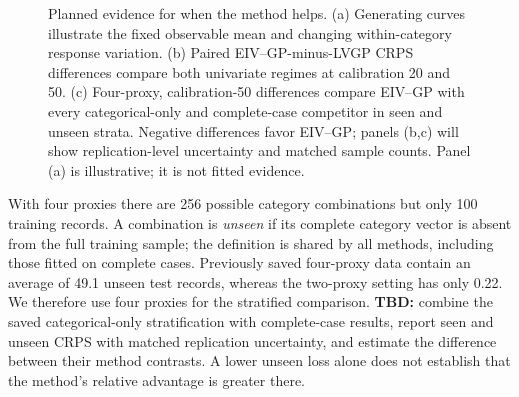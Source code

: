 \begin{figure}[!htbp]
\centering\small
{}\hfill
{}\hfill
{}
\caption{Planned evidence for when the method helps. (a) Generating curves illustrate the fixed observable mean and changing within-category response variation. (b) Paired EIV--GP-minus-LVGP CRPS differences compare both univariate regimes at calibration 20 and 50. (c) Four-proxy, calibration-50 differences compare EIV--GP with every categorical-only and complete-case competitor in seen and unseen strata. Negative differences favor EIV--GP; panels (b,c) will show replication-level uncertainty and matched sample counts. Panel (a) is illustrative; it is not fitted evidence.}
\label{fig:numerical-when}
\end{figure}

With four proxies there are 256 possible category combinations but only 100 training records. A combination is \emph{unseen} if its complete category vector is absent from the full training sample; the definition is shared by all methods, including those fitted on complete cases. Previously saved four-proxy data contain an average of 49.1 unseen test records, whereas the two-proxy setting has only 0.22. We therefore use four proxies for the stratified comparison. \textbf{TBD:} combine the saved categorical-only stratification with complete-case results, report seen and unseen CRPS with matched replication uncertainty, and estimate the difference between their method contrasts. A lower unseen loss alone does not establish that the method's relative advantage is greater there.

